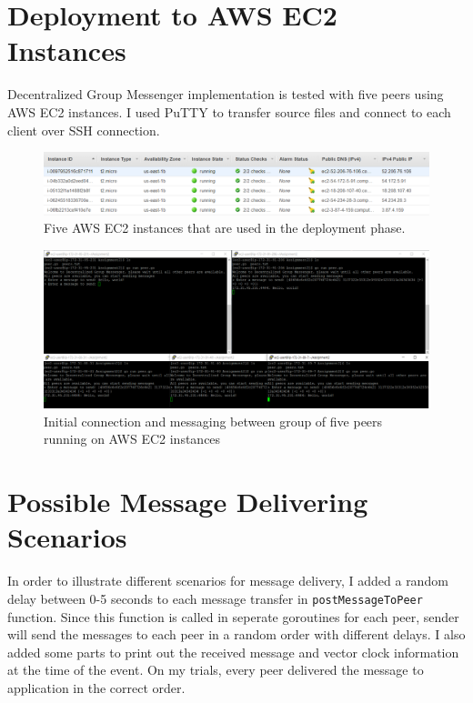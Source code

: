 \documentclass[a4paper]{article}
\begin{document}
\section{Deployment to AWS EC2 Instances}
Decentralized Group Messenger implementation is tested with five peers using AWS EC2 instances. I used PuTTY to transfer source files and connect to each client over SSH connection.

\begin{figure}[!htb]
\centering
\includegraphics[width=\textwidth]{instances.PNG}
\caption{{Five AWS EC2 instances that are used in the deployment phase.}}
\end{figure}


\begin{figure}[!htb]
\centering
\includegraphics[width=\textwidth]{hello.png}
\caption{{Initial connection and messaging between group of five peers running on AWS EC2 instances}}
\end{figure}

\newpage
\section{Possible Message Delivering Scenarios}
In order to illustrate different scenarios for message delivery, I added a random delay between 0-5 seconds to each message transfer in \texttt{postMessageToPeer} function. Since this function is called in seperate goroutines for each peer, sender will send the messages to each peer in a random order with different delays. I also added some parts to print out the received message and vector clock information at the time of the event. On my trials, every peer delivered the message to application in the correct order.
\end{document}
